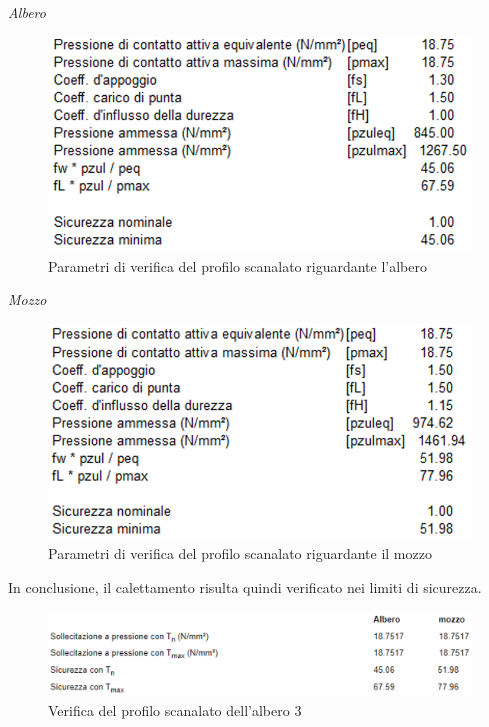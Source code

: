 \emph{Albero}
\begin{figure}[h]
    \centering
    \includegraphics[scale=0.5]{Immagini/RisultatiScanalatoAlbero3.png}
    \caption{Parametri  di verifica del profilo scanalato riguardante l'albero}
    \label{fig:RisultatiScanalatoAlbero3}
\end{figure}

\emph{Mozzo}
\begin{figure}[h]
    \centering
    \includegraphics[scale=0.5]{Immagini/RisultatiScanalatoMozzo3.png}
    \caption{Parametri di verifica del profilo scanalato riguardante il mozzo}
    \label{fig:RisultatiScanalatoMozzo3}
\end{figure}

In conclusione, il calettamento risulta quindi verificato nei limiti di sicurezza.
\begin{figure}[h]
    \centering
    \includegraphics[scale=0.5]{Immagini/RisultatiScanalato3.png}
    \caption{Verifica del profilo scanalato dell'albero 3}
    \label{fig:RisultatiScanalato3}
\end{figure}

